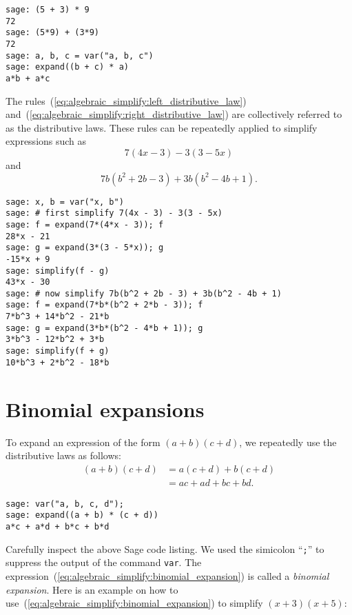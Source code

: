 \begin{lstlisting}
sage: (5 + 3) * 9
72
sage: (5*9) + (3*9)
72
sage: a, b, c = var("a, b, c")
sage: expand((b + c) * a)
a*b + a*c
\end{lstlisting}

The rules~(\ref{eq:algebraic_simplify:left_distributive_law})
and~(\ref{eq:algebraic_simplify:right_distributive_law}) are
collectively referred to as the distributive laws.
These rules can be repeatedly applied to simplify expressions such as
\[
7(4x - 3) - 3(3 - 5x)
\]
and
\[
7b(b^2 + 2b - 3) + 3b(b^2 - 4b + 1).
\]

\begin{lstlisting}
sage: x, b = var("x, b")
sage: # first simplify 7(4x - 3) - 3(3 - 5x)
sage: f = expand(7*(4*x - 3)); f
28*x - 21
sage: g = expand(3*(3 - 5*x)); g
-15*x + 9
sage: simplify(f - g)
43*x - 30
sage: # now simplify 7b(b^2 + 2b - 3) + 3b(b^2 - 4b + 1)
sage: f = expand(7*b*(b^2 + 2*b - 3)); f
7*b^3 + 14*b^2 - 21*b
sage: g = expand(3*b*(b^2 - 4*b + 1)); g
3*b^3 - 12*b^2 + 3*b
sage: simplify(f + g)
10*b^3 + 2*b^2 - 18*b
\end{lstlisting}



\section{Binomial expansions}

To expand an expression of the form $(a + b)(c + d)$, we repeatedly
use the distributive laws as follows:
%
\begin{equation}
\label{eq:algebraic_simplify:binomial_expansion}
\begin{aligned}
(a + b)(c + d)
&= a(c + d) + b(c + d) \\
&= ac + ad + bc + bd.
\end{aligned}
\end{equation}

\begin{lstlisting}
sage: var("a, b, c, d");
sage: expand((a + b) * (c + d))
a*c + a*d + b*c + b*d
\end{lstlisting}

Carefully inspect the above Sage code listing. We used the simicolon
``\texttt{;}'' to suppress the output of the command \texttt{var}. The
expression~(\ref{eq:algebraic_simplify:binomial_expansion}) is called
a \emph{binomial expansion}. Here is an
example on how to
use~(\ref{eq:algebraic_simplify:binomial_expansion}) to simplify
$(x + 3)(x + 5)$:

